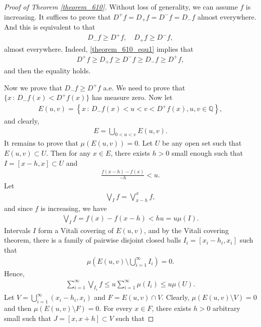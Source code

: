 \documentclass[11pt]{book}
\theoremstyle{definition}
\numberwithin{equation}{chapter}
\begin{document}
\medskip

\begin{proof}[Proof of Theorem \ref{theorem_610}]
Without loss of generality, we can assume $f$ is increasing. It suffices to prove that $D^+f = D_+f = D^-f = D_-f$ almost everywhere. And this is equivalent to that \begin{align}\label{theorem_610_equ1}
    D_- f \geq D^+ f, \quad D_+ f \geq D^- f,
\end{align}
almost everywhere. Indeed, \eqref{theorem_610_equ1} implies that
\begin{align*}
    D^+ f \geq D_+ f \geq D^- f \geq D_- f \geq D^+ f,
\end{align*}
and then the equality holds.

Now we prove that $D_- f \geq D^+ f$ a.e. We need to prove that $\{x \,:\, D_- f(x) < D^+ f(x)\}$ has measure zero. Now let
\begin{align*}
    E(u,v) = \left\{x \,:\, D_- f(x) < u < v < D^+ f(x), u, v \in \mathbb{Q}\right\},
\end{align*}
and clearly,
\begin{align*}
    E = \bigcup_{0 < u < v} E(u,v).
\end{align*}
It remains to prove that $\mu(E(u,v)) = 0$. Let $U$ be any open set such that $E(u,v) \subset U$. Then for any $x \in E$, there exists $h > 0$ small enough such that $I = [x-h,x] \subset U$ and
\begin{align*}
    \frac{f(x-h) - f(x)}{-h} < u.
\end{align*}
Let 
\begin{align*}
    \bigvee_I f = \bigvee^x_{x-h} f,
\end{align*}
and since $f$ is increasing, we have
\begin{align*}
    \bigvee_I f = f(x) - f(x - h) < hu = u \mu(I).
\end{align*}
Intervals $I$ form a Vitali covering of $E(u,v)$, and by the Vitali covering theorem, there is a family of pairwise disjoint closed balls $I_i = [x_i - h_i, x_i]$ such that 
\begin{align*}
    \mu\left(E(u,v) \setminus \bigcup^\infty_{i=1} I_i \right) = 0.
\end{align*}
Hence,
\begin{align*}
    \sum^\infty_{i=1} \bigvee_{I_i} f \leq u \sum^\infty_{i=1} \mu(I_i) \leq u \mu(U).
\end{align*}
Let $V = \bigcup^\infty_{i=1} (x_i-h_i,x_i)$ and $F = E(u,v) \cap V$. Clearly, $\mu(E(u,v) \setminus V) = 0$ and then $\mu(E(u,v) \setminus F) = 0$. For every $x \in F$, there exists $h > 0$ arbitrary small such that $J = [x,x+h] \subset V$ such that 

\end{proof}
\end{document}
